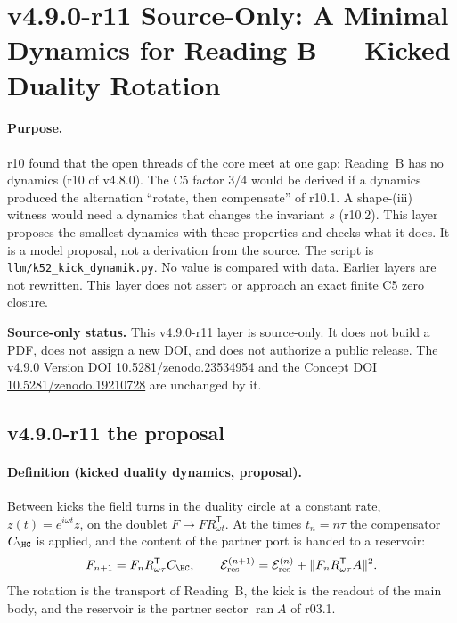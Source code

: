 \clearpage
\section*{v4.9.0-r11 Source-Only: A Minimal Dynamics for Reading B --- Kicked Duality Rotation}
\label{sec:v490-r11-kicked-duality-dynamics}

\paragraph{Purpose.}
r10 found that the open threads of the core meet at one gap: Reading~B has no dynamics (r10 of v4.8.0).  The C5 factor
\(3/4\) would be derived if a dynamics produced the alternation ``rotate, then compensate'' of r10.1.  A shape-(iii) witness
would need a dynamics that changes the invariant \(s\) (r10.2).  This layer proposes the smallest dynamics with these
properties and checks what it does.  It is a model proposal, not a derivation from the source.  The script is
\texttt{llm/k52\_kick\_dynamik.py}.  No value is compared with data.  Earlier layers are not rewritten.
This layer does not assert or approach an exact finite C5 zero closure.

\noindent\textbf{Source-only status.}
This v4.9.0-r11 layer is source-only.  It does not build a PDF, does not assign a new DOI,
and does not authorize a public release.  The v4.9.0 Version DOI
\href{https://doi.org/10.5281/zenodo.23534954}{10.5281/zenodo.23534954} and the Concept DOI
\href{https://doi.org/10.5281/zenodo.19210728}{10.5281/zenodo.19210728} are unchanged by it.

\subsection*{v4.9.0-r11 the proposal}
\label{subsec:v490-r11-proposal}

\paragraph{Definition (kicked duality dynamics, proposal).}
Between kicks the field turns in the duality circle at a constant rate, \(z(t)=e^{i\omega t}z\), on the doublet
\(F\mapsto FR_{\omega t}^{\mathsf T}\).  At the times \(t_n=n\tau\) the compensator \(C_{\HC}\) is applied, and the content of the
partner port is handed to a reservoir:
\[
F_{n+1}=F_nR_{\omega\tau}^{\mathsf T}C_{\HC},\qquad
\mathcal E_{\rm res}^{(n+1)}=\mathcal E_{\rm res}^{(n)}+\|F_nR_{\omega\tau}^{\mathsf T}A\|^2 .
\]
The rotation is the transport of Reading~B, the kick is the readout of the main body, and the reservoir is the partner
sector \(\operatorname{ran}A\) of r03.1.

